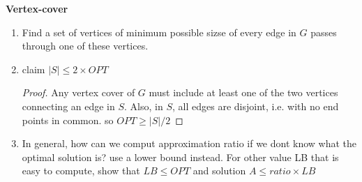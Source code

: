 \documentclass[11pt]{article}
\begin{document}
\begin{example}
    \textbf{Vertex-cover} 
    \begin{enumerate}
        \item Find a set of vertices of minimum possible sizse of every edge in $G$ passes through one of these vertices.
        \item claim $|S| \leq 2 \times OPT$
        \begin{proof}
            Any vertex cover of $G$ must include at least one of the two vertices connecting an edge in $S$. Also, in $S$, all edges are disjoint, i.e. with no end points in common. so $OPT \geq |S| / 2$
        \end{proof}
        \item In general, how can we comput approximation ratio if we dont know what the optimal solution is? use a lower bound instead. For other value LB that is easy to compute, show that $LB \leq OPT$ and solution $A\leq ratio \times LB$
    \end{enumerate}
    \begin{algorithm}[H]
    \end{algorithm}
\end{example}
\end{document}
